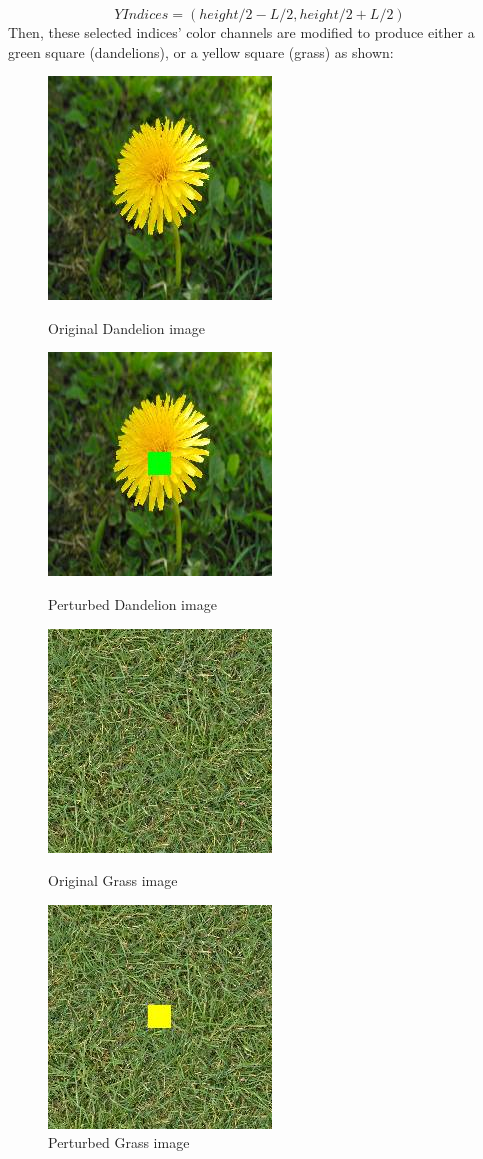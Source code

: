 \documentclass{article}
\begin{document}
\begin{equation} \label{eqn}
    Y Indices = (height/2 - L/2, height/2 + L/2)
\end{equation}
Then, these selected indices' color channels are modified to produce either a green square (dandelions), or a yellow square (grass) as shown:

\begin{figure}
\centering
    \includegraphics[scale = 0.5]{dandelion_constant.jpg}
    \caption{Original Dandelion image}
    \label{fig:my_label}
    \includegraphics[scale = 0.5]{dandelion_constant_pert.jpg}
    \caption{Perturbed Dandelion image}
    \label{fig:my_label}
    \includegraphics[scale = 0.5]{grass_constant.jpg}
    \caption{Original Grass image}
    \label{fig:my_label}
    \includegraphics[scale = 0.5]{grass_constant_pert.jpg}
    \caption{Perturbed Grass image}
    \label{fig:my_label}
\end{figure}
\end{document}
